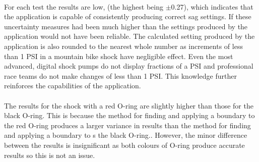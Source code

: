 			\\
			For each test the results are low, (the highest being $\pm$0.27), which indicates that the application is capable of consistently producing correct sag settings. If these uncertainty measures had been  much higher than the settings produced by the application would not have been reliable. The calculated setting produced by the application is also rounded to the nearest whole number as increments  of less than 1 PSI in a mountain bike shock have  negligible effect. Even the most advanced, digital shock pumps do not display fractions of a PSI and professional race teams do not make changes of less than 1 PSI. This knowledge further reinforces the capabilities of the application.
			\\\\
			The results for the shock with a red O-ring are slightly higher than those for the black O-ring. This is because  the method for finding and applying a boundary to the red O-ring produces a larger variance in results than the method for finding and applying a boundary to s the black O-ring.. However, the minor difference between the results is insignificant as both colours of O-ring produce  accurate results so this is  not an issue.
